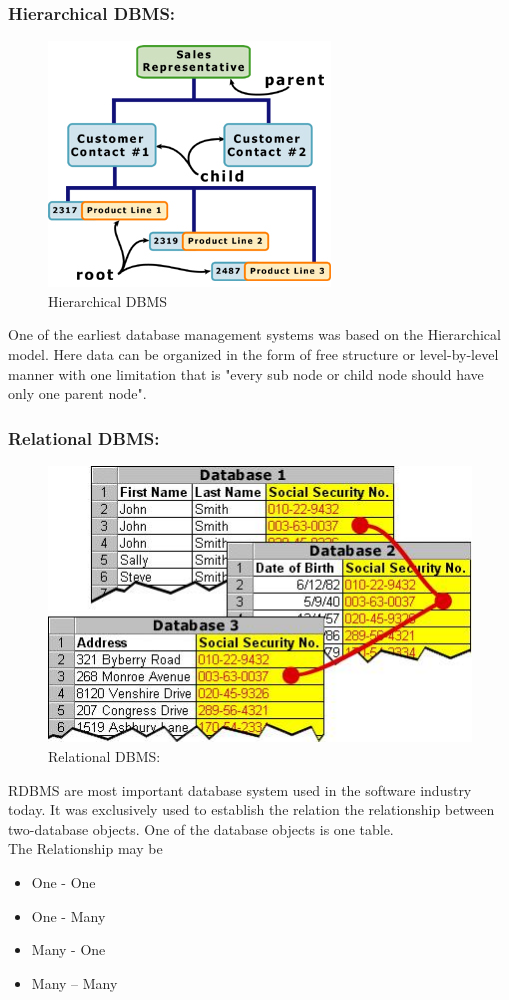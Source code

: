 \documentclass[14pt]{article} %
\begin{document}
\subsubsection{\textbf{Hierarchical DBMS:}}                                
 \begin{figure}[H]
 \centering
  \includegraphics[width=0.6\linewidth]{hierarchical.jpg}
  \caption{Hierarchical DBMS}
  \label{fig:figure 12}
\end{figure}
One of the earliest database management systems was based on the Hierarchical model. Here data can be organized in the form of free structure or level-by-level manner with one limitation that is "every sub node or child node should have only one parent node".
\subsubsection{\textbf{Relational DBMS:}}
 \begin{figure}[H]
 \centering
   \includegraphics[width=0.8\linewidth]{relational.jpg}
  \caption{Relational DBMS:}
  \label{fig:figure 13}
\end{figure}
RDBMS are most important database system used in the software industry today. It was exclusively used to establish the relation the relationship between two-database objects. One of the database objects is one table.
\\The Relationship may be
\begin{itemize}
\item One - One 
\item One - Many
\item Many - One
\item Many – Many
\end{itemize}
\end{document}
